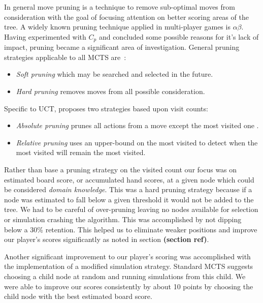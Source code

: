 \documentclass[letterpaper]{article}
\begin{document}
In general move pruning is a technique to remove sub-optimal moves from consideration with the goal of focusing attention on better scoring areas of the tree. A widely known pruning technique applied in multi-player games is $\alpha\beta$. Having experimented with $C_p$ and concluded some possible reasons for it's lack of impact, pruning became a significant area of investigation. General pruning strategies applicable to all MCTS are~\cite{browne2010monte}:
\begin{itemize}
\item \emph{Soft pruning} which may be searched and selected in the future.
\item \emph{Hard pruning} removes moves from all possible consideration.
\end{itemize}
Specific to UCT, \cite{huang2010pruning} proposes two strategies based upon visit counts:
\begin{itemize}
\item \emph{Absolute pruning} prunes all actions from a move except the most visited one .
\item \emph{Relative pruning} uses an upper-bound on the most visited to detect when the most visited will remain the most visited.
\end{itemize}

Rather than base a pruning strategy on the visited count our focus was on estimated board score, or accumulated hand scores, at a given node which could be considered \emph{domain knowledge}. This was a hard pruning strategy because if a node was estimated to fall below a given threshold it would not be added to the tree. We had to be careful of over-pruning leaving no nodes available for selection or simulation crashing the algorithm. This was accomplished by not dipping below a 30\% retention. This helped us to eliminate weaker positions and improve our player's scores significantly as noted in section {\bf(section ref)}.

Another significant improvement to our player's scoring was accomplished with the implementation of a modified simulation strategy. Standard MCTS suggests choosing a child node at random and running simulations from this child. We were able to improve our scores consistently by about 10 points by choosing the child node with the best estimated board score.
\end{document}
